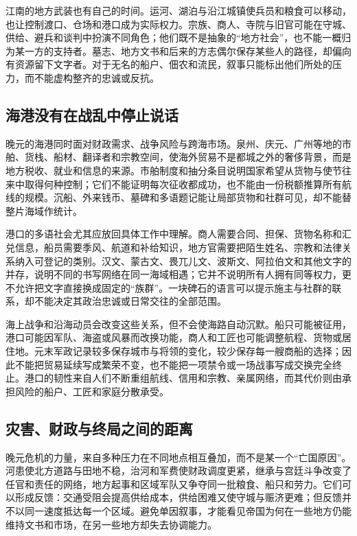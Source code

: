 江南的地方武装也有自己的时间。运河、湖泊与沿江城镇使兵员和粮食可以移动，也让控制渡口、仓场和港口成为实际权力。宗族、商人、寺院与旧官可能在守城、供给、避兵和谈判中扮演不同角色；他们既不是抽象的“地方社会”，也不能一概归为某一方的支持者。墓志、地方文书和后来的方志偶尔保存某些人的路径，却偏向有资源留下文字者。对于无名的船户、佃农和流民，叙事只能标出他们所处的压力，而不能虚构整齐的忠诚或反抗。

\subsection{海港没有在战乱中停止说话}

晚元的海港同时面对财政需求、战争风险与跨海市场。泉州、庆元、广州等地的市舶、货栈、船材、翻译者和宗教空间，使海外贸易不是都城之外的奢侈背景，而是地方税收、就业和信息的来源。市舶制度和抽分条目说明国家希望从货物与使节往来中取得何种控制；它们不能证明每次征收都成功，也不能由一份税额推算所有航线的规模。沉船、外来钱币、墓碑和多语题记能让局部货物和社群可见，却不能替整片海域作统计。

港口的多语社会尤其应放回具体工作中理解。商人需要合同、担保、货物名称和汇兑信息，船员需要季风、航道和补给知识，地方官需要把陌生姓名、宗教和法律关系纳入可登记的类别。汉文、蒙古文、畏兀儿文、波斯文、阿拉伯文和其他文字的并存，说明不同的书写网络在同一海域相遇；它并不说明所有人拥有同等权力，更不允许把文字直接换成固定的“族群”。一块碑石的语言可以提示施主与社群的联系，却不能决定其政治忠诚或日常交往的全部范围。

海上战争和沿海动员会改变这些关系，但不会使海路自动沉默。船只可能被征用，港口可能因军队、海盗或风暴而改换功能，商人和工匠也可能调整航程、货物或居住地。元末军政记录较多保存城市与将领的变化，较少保存每一艘商船的选择；因此不能把贸易延续写成繁荣不变，也不能把一项禁令或一场战事写成交换完全终止。港口的韧性来自人们不断重组航线、信用和宗教、亲属网络，而其代价则由承担风险的船户、工匠和家庭分散承受。

\subsection{灾害、财政与终局之间的距离}

晚元危机的力量，来自多种压力在不同地点相互叠加，而不是某一个“亡国原因”。河患使北方道路与田地不稳，治河和军费使财政调度更紧，继承与宫廷斗争改变了任官和责任的网络，地方起事和区域军队又争夺同一批粮食、船只和劳力。它们可以形成反馈：交通受阻会提高供给成本，供给困难又使守城与赈济更难；但反馈并不以同一速度抵达每一个区域。避免单因叙事，才能看见帝国为何在一些地方仍能维持文书和市场，在另一些地方却失去协调能力。

